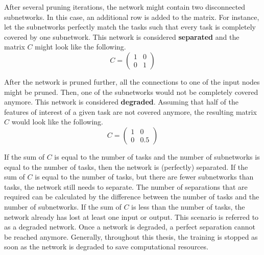 After several pruning iterations, the network might contain two disconnected subnetworks.
In this case, an additional row is added to the matrix.
For instance, let the subnetworks perfectly match the tasks such that every task is completely covered by one subnetwork.
This network is considered \textbf{separated} and the matrix $C$ might look like the following.
\[ C = \begin{pmatrix} 1 & 0 \\ 0 & 1 \end{pmatrix} \]

After the network is pruned further, all the connections to one of the input nodes might be pruned.
Then, one of the subnetworks would not be completely covered anymore.
This network is considered \textbf{degraded}.
Assuming that half of the features of interest of a given task are not covered anymore, the resulting matrix $C$ would look like the following.
\[ C = \begin{pmatrix} 1 & 0 \\ 0 & 0.5 \end{pmatrix} \]

If the sum of $C$ is equal to the number of tasks and the number of subnetworks is equal to the number of tasks, then the network is (perfectly) separated.
If the sum of $C$ is equal to the number of tasks, but there are fewer subnetworks than tasks, the network still needs to separate.
The number of separations that are required can be calculated by the difference between the number of tasks and the number of subnetworks.
If the sum of $C$ is less than the number of tasks, the network already has lost at least one input or output.
This scenario is referred to as a degraded network.
Once a network is degraded, a perfect separation cannot be reached anymore.
Generally, throughout this thesis, the training is stopped as soon as the network is degraded to save computational resources.
